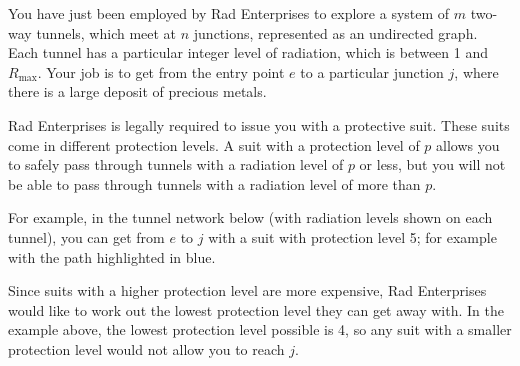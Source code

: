 \documentclass[12pt]{article}
\begin{document}

\begin{question}
You have just been employed by Rad Enterprises to explore a system of $m$ two-way tunnels, which meet at $n$ junctions, represented as an undirected graph. Each tunnel has a particular integer level of radiation, which is between 1 and $R_\max$. Your job is to get from the entry point $e$ to a particular junction $j$, where there is a large deposit of precious metals.

Rad Enterprises is legally required to issue you with a protective suit. These suits come in different protection levels. A suit with a protection level of $p$ allows you to safely pass through tunnels with a radiation level of $p$ or less, but you will not be able to pass through tunnels with a radiation level of more than $p$.

For example, in the tunnel network below (with radiation levels shown on each tunnel), you can get from $e$ to $j$ with a suit with protection level 5; for example with the path highlighted in blue.

\begin{center}
\end{center}

Since suits with a higher protection level are more expensive, Rad Enterprises would like to work out the lowest protection level they can get away with. In the example above, the lowest protection level possible is 4, so any suit with a smaller protection level would not allow you to reach $j.$


\end{question}
\end{document}
